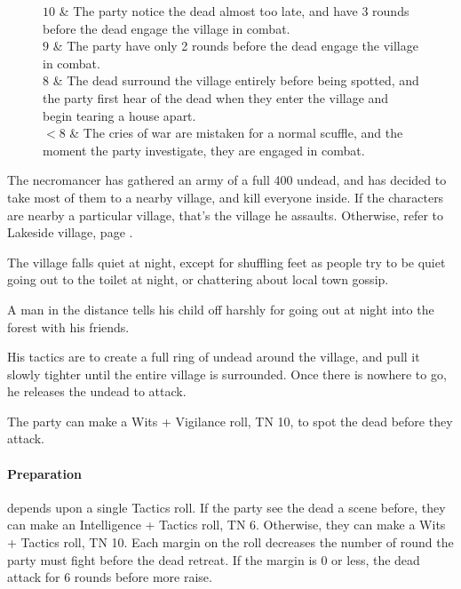 \begin{multicols}{2}
\begin{figure*}[t]
\begin{rollchart}
	$10$ & The party notice the dead almost too late, and have 3 rounds before the dead engage the village in combat. \\

	$9$ & The party have only 2 rounds before the dead engage the village in combat. \\

	$8$ & The dead surround the village entirely before being spotted, and the party first hear of the dead when they enter the village and begin tearing a house apart. \\

	$<8$ & The cries of war are mistaken for a normal scuffle, and the moment the party investigate, they are engaged in combat. \\

\end{rollchart}
\end{figure*}

The necromancer has gathered an army of a full 400 undead, and has decided to take most of them to a nearby village, and kill everyone inside.
If the characters are nearby a particular village, that's the village he assaults.
Otherwise, refer to Lakeside village, page \pageref{lakeside}.

\begin{boxtext}
	The village falls quiet at night, except for shuffling feet as people try to be quiet going out to the toilet at night, or chattering about local town gossip.

	A man in the distance tells his child off harshly for going out at night into the forest with his friends.
\end{boxtext}

His tactics are to create a full ring of undead around the village, and pull it slowly tighter until the entire village is surrounded.
Once there is nowhere to go, he releases the undead to attack.

The party can make a Wits + Vigilance roll, TN 10, to spot the dead before they attack.

\paragraph{Preparation} depends upon a single Tactics roll.
If the party see the dead a scene before, they can make an Intelligence + Tactics roll, TN 6.
Otherwise, they can make a Wits + Tactics roll, TN 10.
Each margin on the roll decreases the number of round the party must fight before the dead retreat.
If the margin is 0 or less, the dead attack for 6 rounds before more raise.


\end{multicols}

